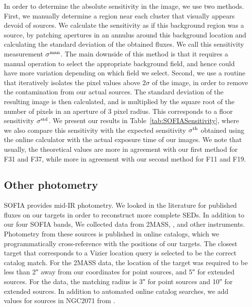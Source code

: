\begin{table}[!h]
\label{tab:SOFIASensitivity}
\end{table}

In order to determine the absolute sensitivity in the image, we use two methods. First, we manually determine a region near each cluster that visually appears devoid of sources. We calculate the sensitivity as if this background region was a source, by patching apertures in an annulus around this background location and calculating the standard deviation of the obtained fluxes. We call this sensitivity measurement $\sigma^\textrm{man}$. The main downside of this method is that it requires a manual operation to select the appropriate background field, and hence could have more variation depending on which field we select. Second, we use a routine that iteratively isolates the pixel values above $2\sigma$ of the image, in order to remove the contamination from our actual sources. The standard deviation of the resulting image is then calculated, and is multiplied by the square root of the number of pixels in an aperture of 3 pixel radius. This corresponds to a floor sensitivity $\sigma^\textrm{std}$. We present our results in Table~\ref{tab:SOFIASensitivity}, where we also compare this sensitivity with the expected sensitivity $\sigma^\textrm{th}$ obtained using the online calculator with the actual exposure time of our images. We note that usually, the theoretical values are more in agreement with our first method for F31 and F37, while more in agreement with our second method for F11 and F19. 



\subsection{Other photometry}

SOFIA provides mid-IR photometry. We looked in the literature for published fluxes on our targets in order to reconstruct more complete SEDs. In addition to our four SOFIA bands, We collected data from 2MASS, \Spitzer, and other instruments. Photometry from these sources is published in online catalogs, which we programmatically cross-reference with the positions of our targets. The closest target that corresponds to a Vizier location query is selected to be the correct catalog match. For the 2MASS data, the location of the target was required to be less than \ang{;;2} away from our coordinates for point sources, and \ang{;;5} for extended sources. For the \Spitzer data, the matching radius is \ang{;;3} for point sources and \ang{;;10} for extended sources. In addition to automated online catalog searches, we add values for sources in NGC2071 from \citet{vanKempen:2012fb}.

